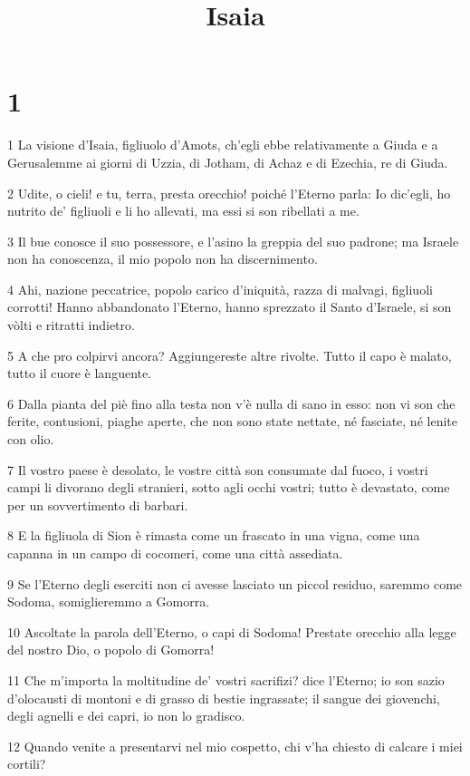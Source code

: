 

\title{Isaia}


\chapter{1}

\par 1 La visione d'Isaia, figliuolo d'Amots, ch'egli ebbe relativamente a Giuda e a Gerusalemme ai giorni di Uzzia, di Jotham, di Achaz e di Ezechia, re di Giuda.
\par 2 Udite, o cieli! e tu, terra, presta orecchio! poiché l'Eterno parla: Io dic'egli, ho nutrito de' figliuoli e li ho allevati, ma essi si son ribellati a me.
\par 3 Il bue conosce il suo possessore, e l'asino la greppia del suo padrone; ma Israele non ha conoscenza, il mio popolo non ha discernimento.
\par 4 Ahi, nazione peccatrice, popolo carico d'iniquità, razza di malvagi, figliuoli corrotti! Hanno abbandonato l'Eterno, hanno sprezzato il Santo d'Israele, si son vòlti e ritratti indietro.
\par 5 A che pro colpirvi ancora? Aggiungereste altre rivolte. Tutto il capo è malato, tutto il cuore è languente.
\par 6 Dalla pianta del piè fino alla testa non v'è nulla di sano in esso: non vi son che ferite, contusioni, piaghe aperte, che non sono state nettate, né fasciate, né lenite con olio.
\par 7 Il vostro paese è desolato, le vostre città son consumate dal fuoco, i vostri campi li divorano degli stranieri, sotto agli occhi vostri; tutto è devastato, come per un sovvertimento di barbari.
\par 8 E la figliuola di Sion è rimasta come un frascato in una vigna, come una capanna in un campo di cocomeri, come una città assediata.
\par 9 Se l'Eterno degli eserciti non ci avesse lasciato un piccol residuo, saremmo come Sodoma, somiglieremmo a Gomorra.
\par 10 Ascoltate la parola dell'Eterno, o capi di Sodoma! Prestate orecchio alla legge del nostro Dio, o popolo di Gomorra!
\par 11 Che m'importa la moltitudine de' vostri sacrifizi? dice l'Eterno; io son sazio d'olocausti di montoni e di grasso di bestie ingrassate; il sangue dei giovenchi, degli agnelli e dei capri, io non lo gradisco.
\par 12 Quando venite a presentarvi nel mio cospetto, chi v'ha chiesto di calcare i miei cortili?
